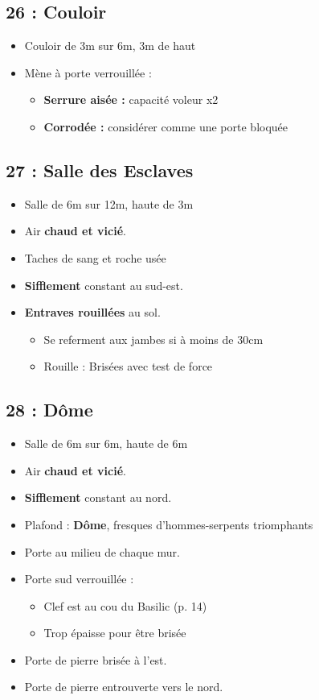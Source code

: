 \subsection{26 : Couloir}\label{n3:s26}
\begin{itemize}
  \item Couloir de 3m sur 6m, 3m de haut
  \item Mène à porte verrouillée :
  \begin{itemize}
    \item \textbf{Serrure aisée :} capacité voleur x2
    \item \textbf{Corrodée :} considérer comme une porte bloquée
  \end{itemize}
\end{itemize}

\subsection{27 : Salle des Esclaves}\label{n3:s27}
\begin{itemize}
  \item Salle de 6m sur 12m, haute de 3m
  \item Air \textbf{chaud et vicié}.
  \item Taches de sang et roche usée
  \item \textbf{Sifflement} constant au sud-est.
  \item \textbf{Entraves rouillées} au sol.
  \begin{itemize}
    \item Se referment aux jambes si à moins de 30cm
    \item Rouille : Brisées avec test de force
  \end{itemize}
\end{itemize}


\subsection{28 : Dôme}\label{n3:s28}
\begin{itemize}
  \item Salle de 6m sur 6m, haute de 6m
  \item Air \textbf{chaud et vicié}.
  \item \textbf{Sifflement} constant au nord.
  \item Plafond : \textbf{Dôme},  fresques d'hommes-serpents triomphants
  \item Porte au milieu de chaque mur.
  \item Porte sud verrouillée :
  \begin{itemize}
    \item Clef est au cou du Basilic (p. 14)
    \item Trop épaisse pour être brisée
  \end{itemize}
  \item Porte de pierre brisée à l'est.
  \item Porte de pierre entrouverte vers le nord.
\end{itemize}

